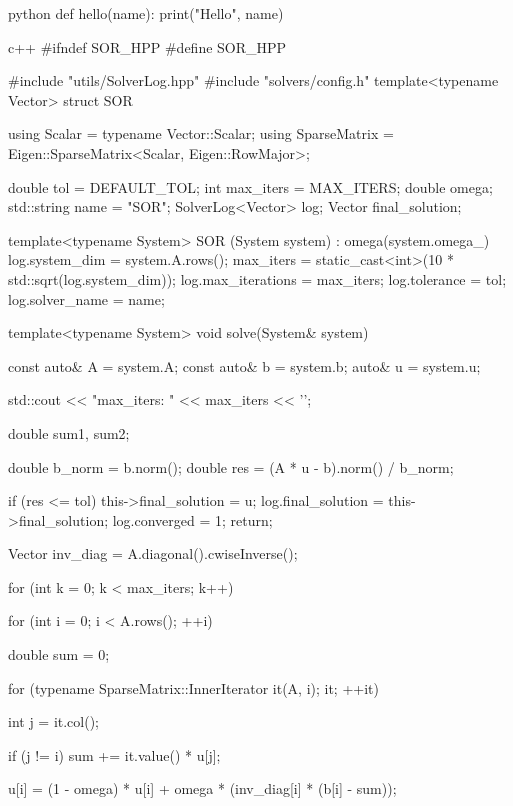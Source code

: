 \begin{codeblock}{python}
def hello(name):
    print("Hello", name)
\end{codeblock}

\begin{codeblock}{c++}
#ifndef SOR_HPP
#define SOR_HPP

#include "utils/SolverLog.hpp"
#include "solvers/config.h"
template<typename Vector>
struct SOR
{   
    using Scalar       = typename Vector::Scalar;
    using SparseMatrix = Eigen::SparseMatrix<Scalar, Eigen::RowMajor>;

    double              tol       = DEFAULT_TOL;
    int                 max_iters = MAX_ITERS;
    double              omega;
    std::string         name      = "SOR";
    SolverLog<Vector>   log;
    Vector              final_solution;
    
    template<typename System>
    SOR (System system) : omega(system.omega_)
    {   
        log.system_dim     = system.A.rows();
        max_iters          = static_cast<int>(10 * std::sqrt(log.system_dim));
        log.max_iterations = max_iters;
        log.tolerance      = tol;
        log.solver_name    = name;
    }

    template<typename System>
    void solve(System& system)
    {   
        const auto& A        = system.A;
        const auto& b        = system.b;
              auto& u        = system.u;

        std::cout << "max_iters: " << max_iters << '\n';

        double sum1, sum2;
        
        double b_norm   = b.norm();
        double res      = (A * u - b).norm() / b_norm;

        if (res <= tol) 
        {   
            this->final_solution = u;
            log.final_solution   = this->final_solution;
            log.converged = 1;
            return;
        }

        Vector inv_diag = A.diagonal().cwiseInverse();

        for (int k = 0; k < max_iters; k++)
        {   
            for (int i = 0; i < A.rows(); ++i)
            {   
                double sum = 0;

                for (typename SparseMatrix::InnerIterator it(A, i); it; ++it)
                {
                    int j = it.col();

                    if (j != i)
                    {
                        sum += it.value() * u[j];
                    }
                }
                u[i] = (1 - omega) * u[i] + omega * (inv_diag[i] * (b[i] - sum));
            }
             
}}}
\end{codeblock}
